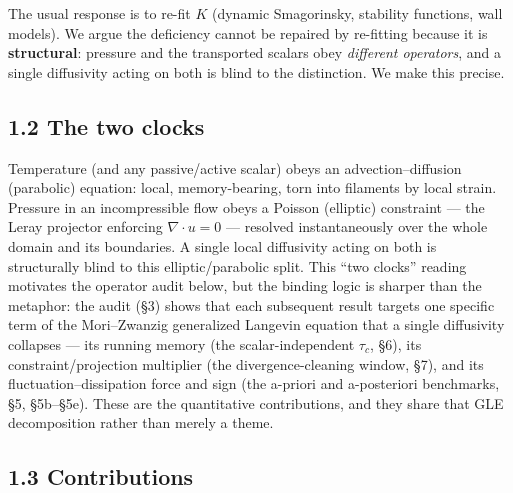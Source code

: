 \documentclass[11pt]{article}
\begin{document}
The usual response is to re-fit $K$ (dynamic Smagorinsky, stability functions, wall models). We argue the deficiency cannot be repaired by re-fitting because it is \textbf{structural}: pressure and the transported scalars obey \emph{different operators}, and a single diffusivity acting on both is blind to the distinction. We make this precise.


\subsection*{1.2 The two clocks}


Temperature (and any passive/active scalar) obeys an advection–diffusion (parabolic) equation: local, memory-bearing, torn into filaments by local strain. Pressure in an incompressible flow obeys a Poisson (elliptic) constraint — the Leray projector enforcing $\nabla \cdot u=0$ — resolved instantaneously over the whole domain and its boundaries. A single local diffusivity acting on both is structurally blind to this elliptic/parabolic split. This ``two clocks'' reading motivates the operator audit below, but the binding logic is sharper than the metaphor: the audit (§3) shows that each subsequent result targets one specific term of the Mori–Zwanzig generalized Langevin equation that a single diffusivity collapses — its running memory (the scalar-independent $\tau _{c}$, §6), its constraint/projection multiplier (the divergence-cleaning window, §7), and its fluctuation–dissipation force and sign (the a-priori and a-posteriori benchmarks, §5, §5b–§5e). These are the quantitative contributions, and they share that GLE decomposition rather than merely a theme.


\subsection*{1.3 Contributions}
\end{document}
